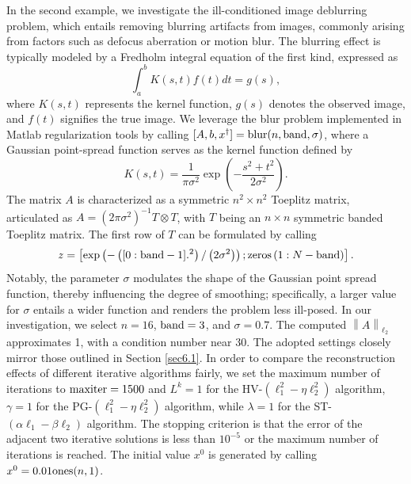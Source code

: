 \documentclass[a4paper,12pt]{article}
\numberwithin{equation}{section}
\begin{document}
\par In the second example,  we investigate the ill-conditioned image deblurring problem, which entails removing blurring artifacts from images, commonly arising from factors such as defocus aberration or motion blur. The blurring effect is typically modeled by a Fredholm integral equation of the first kind, expressed as
\begin{equation*}
    \int_{a}^{b}K\left(s,t\right)f\left(t\right)dt = g\left(s\right),
\end{equation*}
where $K\left(s,t\right)$ represents the kernel function, $g\left(s\right)$ denotes the observed image, and $f\left(t\right)$ signifies the true image. We leverage the blur problem implemented in Matlab regularization tools \cite{H07} by calling $[A,b,x^{\dagger}]={\rm blur}(n,{\rm band},\sigma)$, where a Gaussian point-spread function serves as the kernel function defined by
\begin{equation*}
    K\left(s,t\right)=\frac{1}{\pi \sigma^{2}}\exp\left(-\frac{s^{2}+t^{2}}{2\sigma^{2}}\right).
\end{equation*}
The matrix $A$ is characterized as a symmetric $n^{2}\times n^{2}$ Toeplitz matrix, articulated as $A=\left(2\pi\sigma^{2}\right)^{-1}T\otimes T$, with $T$ being an $n\times n$ symmetric banded Toeplitz matrix. The first row of $T$  can be formulated by calling
\begin{equation*}
    z=\left[\exp\left(-\left([0:{\rm band}-1].^{2}\right)/\left(2\sigma^{2}\right)\right); {\rm zeros}\left(1:N-{\rm band}\right)\right].
\end{equation*}
Notably, the parameter $\sigma$ modulates the shape of the Gaussian point spread function, thereby influencing the degree of smoothing; specifically, a larger value for $\sigma$ entails a wider function and renders the problem less ill-posed. In our investigation, we select $n=16$, ${\rm band}=3$, and $\sigma=0.7$. The computed $\left\|A\right\|_{\ell_{2}}$ approximates 1, with a condition number near 30. The adopted settings closely mirror those outlined in Section \ref{sec6.1}. In order to compare the reconstruction effects of different iterative algorithms fairly, we set the maximum number of iterations to ${\rm maxiter} = 1500$ and $L^{k}=1$ for the HV-$\left(\ell_{1}^{2}-\eta\ell_{2}^{2}\right)$ algorithm, $\gamma=1$ for the PG-$\left(\ell_{1}^{2}-\eta\ell_{2}^{2}\right)$ algorithm, while $\lambda=1$ for the ST-$\left(\alpha\ell_{1}-\beta\ell_{2}\right)$ algorithm. The stopping criterion is that the error of the adjacent two iterative solutions is less than $10^{-5}$ or the maximum number of iterations is reached. The initial value $x^{0}$ is generated by calling $x^{0}=0.01{\rm ones}(n,1)$.
\end{document}
